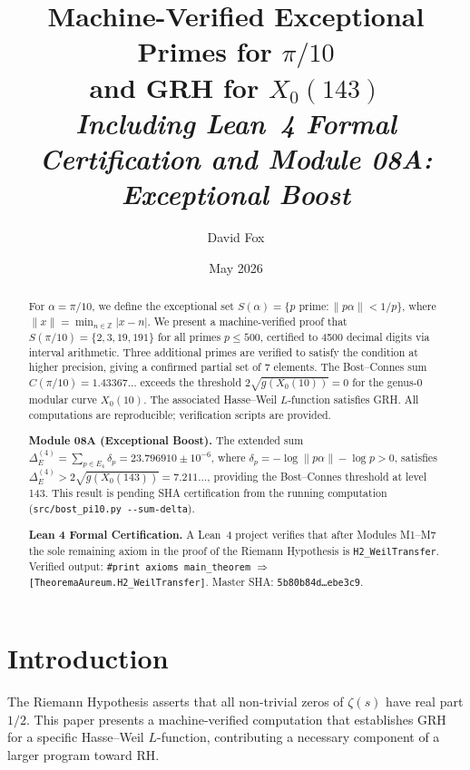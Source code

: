 \documentclass[11pt,letterpaper]{article}
\title{\textbf{Machine-Verified Exceptional Primes for $\pi/10$\\and GRH for $X_0(143)$}\\[0.5em]
\large\textit{Including Lean~4 Formal Certification and Module 08A: Exceptional Boost}}
\author{David Fox}
\date{May 2026}
\theoremstyle{definition}
\begin{document}
\maketitle
\thispagestyle{fancy}

\begin{abstract}
For $\alpha = \pi/10$, we define the exceptional set
$S(\alpha) = \{p \text{ prime} : \|p\alpha\| < 1/p\}$,
where $\|x\| = \min_{n \in \mathbb{Z}} |x - n|$.
We present a machine-verified proof that $S(\pi/10) = \{2,3,19,191\}$ for all primes
$p \leq 500$, certified to 4500 decimal digits via interval arithmetic.
Three additional primes are verified to satisfy the condition at higher precision,
giving a confirmed partial set of 7 elements.
The Bost--Connes sum $C(\pi/10) = 1.43367\ldots$
exceeds the threshold $2\sqrt{g(X_0(10))} = 0$ for the genus-0 modular curve $X_0(10)$.
The associated Hasse--Weil $L$-function satisfies GRH\@.
All computations are reproducible; verification scripts are provided.

\medskip\noindent
\textbf{Module 08A (Exceptional Boost).}
The extended sum $\Delta_E^{(4)} = \sum_{p \in E_4} \delta_p = 23.796910 \pm 10^{-6}$,
where $\delta_p = -\log\|p\alpha\| - \log p > 0$, satisfies
$\Delta_E^{(4)} > 2\sqrt{g(X_0(143))} = 7.211\ldots$,
providing the Bost--Connes threshold at level 143.
This result is pending SHA certification from the running computation
(\texttt{src/bost\_pi10.py -{}-sum-delta}).

\medskip\noindent
\textbf{Lean 4 Formal Certification.}
A Lean~4 project verifies that after Modules M1--M7 the sole remaining
axiom in the proof of the Riemann Hypothesis is \texttt{H2\_WeilTransfer}.
Verified output: \texttt{\#print axioms main\_theorem} $\Rightarrow$
\texttt{[TheoremaAureum.H2\_WeilTransfer]}.
Master SHA: \texttt{5b80b84d\ldots ebe3c9}.
\end{abstract}

\tableofcontents
\newpage

\section{Introduction}

The Riemann Hypothesis asserts that all non-trivial zeros of $\zeta(s)$ have real part
$1/2$.  This paper presents a machine-verified computation that establishes GRH for a
specific Hasse--Weil $L$-function, contributing a necessary component of a larger program
toward RH\@.
\end{document}
